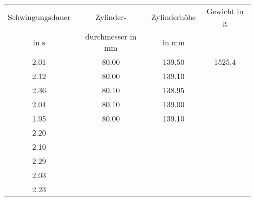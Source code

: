 \begin{center}
	\begin{tabular}{ c || c | c | c }
	\hline
		Schwingungsdauer & Zylinder- & Zylinderhöhe & Gewicht in g \\
		in s & durchmesser in mm & in mm & \\
	\hline
		2.01 & 80.00 & 139.50 & 1525.4 \\
		2.12 & 80.00 & 139.10 & \\
		2.36 & 80.10 & 138.95 & \\
		2.04 & 80.10 & 139.00 & \\
		1.95 & 80.00 & 139.10 & \\
		2.20 & & & \\
		2.10 & & & \\
		2.29 & & & \\
		2.03 & & & \\
		2.23 & & & \\
	\end{tabular}
\end{center}